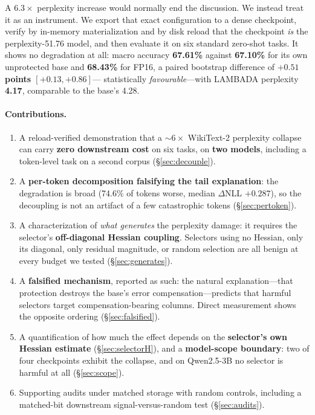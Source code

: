 \documentclass[11pt]{article}
\newcommand{\best}[1]{\textbf{#1}}
\begin{document}
A $6.3\times$ perplexity increase would normally end the discussion. We instead treat it as an
instrument. We export that exact configuration to a dense checkpoint, verify by in-memory
materialization and by disk reload that the checkpoint \emph{is} the perplexity-51.76 model,
and then evaluate it on six standard zero-shot tasks. It shows no degradation at all: macro
accuracy \best{67.61\%} against \best{67.10\%} for its own unprotected base and \best{68.43\%}
for FP16, a paired bootstrap difference of \best{$+0.51$ points $[+0.13, +0.86]$}---
statistically \emph{favourable}---with LAMBADA perplexity \best{4.17}, comparable to the base's
4.28.

\paragraph{Contributions.}
\begin{enumerate}\itemsep2pt
\item A reload-verified demonstration that a ${\sim}6\times$ WikiText-2 perplexity collapse can
carry \textbf{zero downstream cost} on six tasks, on \textbf{two models}, including a
token-level task on a second corpus (\S\ref{sec:decouple}).
\item A \textbf{per-token decomposition falsifying the tail explanation}: the degradation is
broad (74.6\% of tokens worse, median $\Delta$NLL $+0.287$), so the decoupling is not an
artifact of a few catastrophic tokens (\S\ref{sec:pertoken}).
\item A characterization of \emph{what generates} the perplexity damage: it requires the
selector's \textbf{off-diagonal Hessian coupling}. Selectors using no Hessian, only its
diagonal, only residual magnitude, or random selection are all benign at every budget we tested
(\S\ref{sec:generates}).
\item A \textbf{falsified mechanism}, reported as such: the natural explanation---that
protection destroys the base's error compensation---predicts that harmful selectors target
compensation-bearing columns. Direct measurement shows the opposite ordering
(\S\ref{sec:falsified}).
\item A quantification of how much the effect depends on the \textbf{selector's own Hessian
estimate} (\S\ref{sec:selectorH}), and a \textbf{model-scope boundary}: two of four checkpoints
exhibit the collapse, and on Qwen2.5-3B no selector is harmful at all (\S\ref{sec:scope}).
\item Supporting audits under matched storage with random controls, including a matched-bit
downstream signal-versus-random test (\S\ref{sec:audits}).
\end{enumerate}
\end{document}
